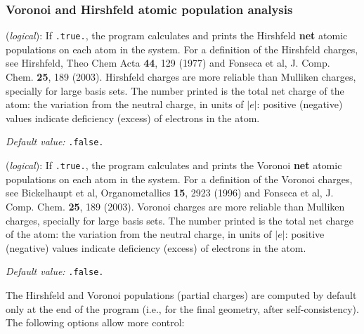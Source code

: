\documentclass[11pt]{article}
\begin{document}
\subsubsection{Voronoi and Hirshfeld atomic population analysis}
\begin{description}
\itemsep 10pt
\parsep 0pt

\item[{\bf WriteHirshfeldPop}] ({\it logical}): 
%
If {\tt .true.}, the program calculates and prints the Hirshfeld {\bf
  net} atomic populations on each atom in the system. For a definition
of the Hirshfeld charges, see Hirshfeld, Theo Chem Acta {\bf 44}, 129
(1977) and Fonseca et al, J. Comp. Chem. {\bf 25}, 189 (2003).
Hirshfeld charges are more reliable than Mulliken charges, specially
for large basis sets.  The number printed is the total net charge of
the atom: the variation from the neutral charge, in units of $|e|$:
positive (negative) values indicate deficiency (excess) of electrons
in the atom.

{\it Default value:} {\tt .false.} 


\item[{\bf WriteVoronoiPop}] ({\it logical}): 
%
If {\tt .true.}, the program calculates and prints the Voronoi {\bf
  net} atomic populations on each atom in the system. For a definition
of the Voronoi charges, see Bickelhaupt et al, Organometallics {\bf
  15}, 2923 (1996) and Fonseca et al, J. Comp. Chem. {\bf 25}, 189
(2003).  Voronoi charges are more reliable than Mulliken charges,
specially for large basis sets.  The number printed is the total net
charge of the atom: the variation from the neutral charge, in units of
$|e|$: positive (negative) values indicate deficiency (excess) of
electrons in the atom.

{\it Default value:} {\tt .false.}

\end{description}

The Hirshfeld and Voronoi populations (partial charges) are computed
by default only at the end of the program (i.e., for the final
geometry, after self-consistency). The following options allow more control:
\end{document}
